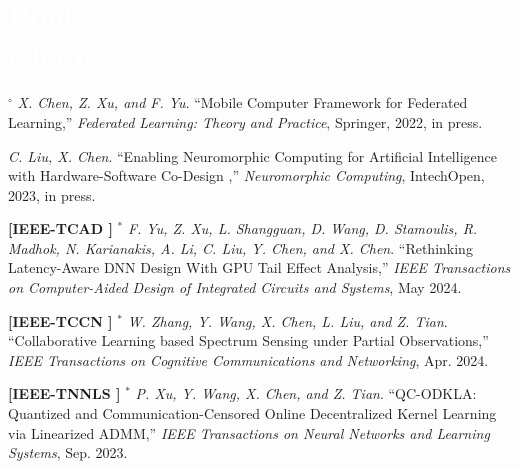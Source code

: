 
\section{\textcolor{white}{Book\\Chapters}}
\vspace{-2mm}

	$^\circ$
	\textsl{X. Chen, Z. Xu, and F. Yu}.
		``Mobile Computer Framework for Federated Learning,''
		\textsl{Federated Learning: Theory and Practice}, Springer, 2022, in press.
			\vspace{-3mm}

	\textsl{C. Liu, X. Chen}.
		``Enabling Neuromorphic Computing for Artificial Intelligence with Hardware-Software Co-Design
,''
		\textsl{Neuromorphic Computing}, IntechOpen, 2023, in press.









	\textbf{[IEEE-TCAD ]}
	$^\ast$
	\textsl{F. Yu, Z. Xu, L. Shangguan, D. Wang, D. Stamoulis, R. Madhok, N. Karianakis, A. Li, C. Liu, Y. Chen, and X. Chen}.
		``Rethinking Latency-Aware DNN Design With GPU Tail Effect Analysis,''
		\textsl{IEEE Transactions on Computer-Aided Design of Integrated Circuits and Systems}, May 2024.
			\vspace{-3mm}

	\textbf{[IEEE-TCCN ]}
	$^\ast$
	\textsl{W. Zhang, Y. Wang, X. Chen, L. Liu, and Z. Tian}.
		``Collaborative Learning based Spectrum Sensing under Partial Observations,''
		\textsl{IEEE Transactions on Cognitive Communications and Networking}, Apr. 2024.
			\vspace{-3mm}

	\textbf{[IEEE-TNNLS ]}
	$^\ast$
	\textsl{P. Xu, Y. Wang, X. Chen, and Z. Tian}.
		``QC-ODKLA\@: Quantized and Communication-Censored Online Decentralized Kernel Learning via Linearized ADMM,''
		\textsl{IEEE Transactions on Neural Networks and Learning Systems}, Sep. 2023.
			\vspace{-3mm}

